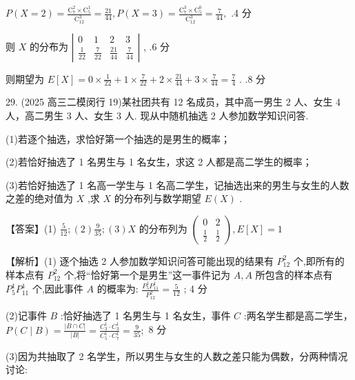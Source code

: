 \documentclass[10pt]{article}
\begin{document}
\(P\left( {X = 2}\right)  = \frac{{\mathrm{C}}_{7}^{2} \times  {\mathrm{C}}_{5}^{1}}{{\mathrm{C}}_{12}^{3}} = \frac{21}{44},P\left( {X = 3}\right)  = \frac{{\mathrm{C}}_{7}^{3} \times  {\mathrm{C}}_{5}^{0}}{{\mathrm{C}}_{12}^{3}} = \frac{7}{44},\) .4 分

则 \(X\) 的分布为 \(\left| \begin{matrix} 0 & 1 & 2 & 3 \\  \frac{1}{22} & \frac{7}{22} & \frac{21}{44} & \frac{7}{44} \end{matrix}\right|\) , .6 分

则期望为 \(E\left\lbrack  X\right\rbrack   = 0 \times  \frac{1}{22} + 1 \times  \frac{7}{22} + 2 \times  \frac{21}{44} + 3 \times  \frac{7}{44} = \frac{7}{4}\) . .8 分

29. (2025 高三二模闵行 19)某社团共有 12 名成员，其中高一男生 2 人、女生 4 人，高二男生 3 人、女生 3 人. 现从中随机抽选 2 人参加数学知识问答.

(1)若逐个抽选，求恰好第一个抽选的是男生的概率；

(2)若恰好抽选了 1 名男生与 1 名女生，求这 2 人都是高二学生的概率；

(3)若恰好抽选了 1 名高一学生与 1 名高二学生，记抽选出来的男生与女生的人数之差的绝对值为 \(X\) ,求 \(X\) 的分布列与数学期望 \(E\left( X\right)\) .

【答案】(1) \(\frac{5}{12};\left( 2\right) \frac{9}{35};\left( 3\right) X\) 的分布列为 \(\left( \begin{matrix} 0 & 2 \\  \frac{1}{2} & \frac{1}{2} \end{matrix}\right) ,E\left\lbrack  X\right\rbrack   = 1\)

【解析】(1) 逐个抽选 2 人参加数学知识问答可能出现的结果有 \({P}_{12}^{2}\) 个,即所有的样本点有 \({P}_{12}^{2}\) 个,将“恰好第一个是男生”这一事件记为 \(A,A\) 所包含的样本点有 \({P}_{5}^{1}{P}_{11}^{1}\) 个,因此事件 \(A\) 的概率为: \(\frac{{P}_{5}^{1}{P}_{11}^{1}}{{P}_{12}^{2}} = \frac{5}{12}\) ; 4 分

(2)记事件 \(B\) :恰好抽选了 1 名男生与 1 名女生，事件 \(C\) :两名学生都是高二学生， \(P\left( {C \mid  B}\right)  = \frac{\left| B \cap  C\right| }{\left| B\right| } = \frac{{C}_{3}^{1} \cdot  {C}_{3}^{1}}{{C}_{5}^{1} \cdot  {C}_{7}^{1}} = \frac{9}{35};\) 8 分

(3)因为共抽取了 2 名学生，所以男生与女生的人数之差只能为偶数，分两种情况讨论:

\begin{center}
\end{center}
\end{document}
